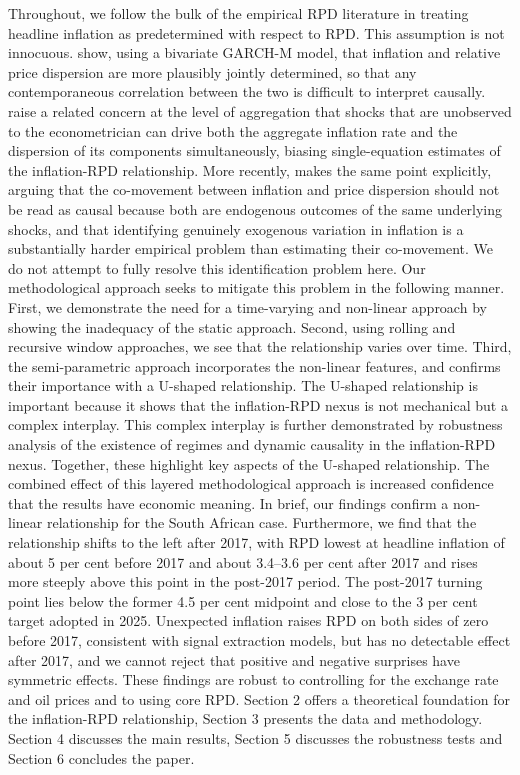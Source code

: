\documentclass[
  letterpaper,
  DIV=11,
  numbers=noendperiod]{scrartcl}
\begin{document}
Throughout, we follow the bulk of the empirical RPD literature in
treating headline inflation as predetermined with respect to RPD. This
assumption is not innocuous. \citet{grier1996} show, using a bivariate
GARCH-M model, that inflation and relative price dispersion are more
plausibly jointly determined, so that any contemporaneous correlation
between the two is difficult to interpret causally. \citet{parsley1996}
raise a related concern at the level of aggregation that shocks that are
unobserved to the econometrician can drive both the aggregate inflation
rate and the dispersion of its components simultaneously, biasing
single-equation estimates of the inflation-RPD relationship. More
recently, \citet{sheremirov2020} makes the same point explicitly,
arguing that the co-movement between inflation and price dispersion
should not be read as causal because both are endogenous outcomes of the
same underlying shocks, and that identifying genuinely exogenous
variation in inflation is a substantially harder empirical problem than
estimating their co-movement. We do not attempt to fully resolve this
identification problem here. Our methodological approach seeks to
mitigate this problem in the following manner. First, we demonstrate the
need for a time-varying and non-linear approach by showing the
inadequacy of the static approach. Second, using rolling and recursive
window approaches, we see that the relationship varies over time. Third,
the semi-parametric approach incorporates the non-linear features, and
confirms their importance with a U-shaped relationship. The U-shaped
relationship is important because it shows that the inflation-RPD nexus
is not mechanical but a complex interplay. This complex interplay is
further demonstrated by robustness analysis of the existence of regimes
and dynamic causality in the inflation-RPD nexus. Together, these
highlight key aspects of the U-shaped relationship. The combined effect
of this layered methodological approach is increased confidence that the
results have economic meaning. In brief, our findings confirm a
non-linear relationship for the South African case. Furthermore, we find
that the relationship shifts to the left after 2017, with RPD lowest at
headline inflation of about 5 per cent before 2017 and about 3.4--3.6
per cent after 2017 and rises more steeply above this point in the
post-2017 period. The post-2017 turning point lies below the former 4.5
per cent midpoint and close to the 3 per cent target adopted in 2025.
Unexpected inflation raises RPD on both sides of zero before 2017,
consistent with signal extraction models, but has no detectable effect
after 2017, and we cannot reject that positive and negative surprises
have symmetric effects. These findings are robust to controlling for the
exchange rate and oil prices and to using core RPD. Section 2 offers a
theoretical foundation for the inflation-RPD relationship, Section 3
presents the data and methodology. Section 4 discusses the main results,
Section 5 discusses the robustness tests and Section 6 concludes the
paper.
\end{document}
